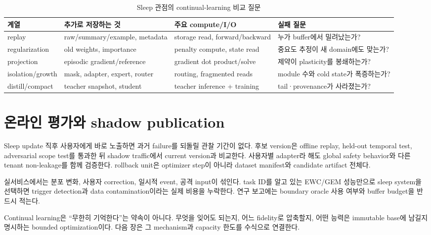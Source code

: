 \begin{table}[htbp]
\centering
\caption{Sleep 관점의 continual-learning 비교 질문}
\label{tab:bg-cl-comparison}
\small
\begin{tabularx}{\textwidth}{p{} X X X}
\toprule
계열 & 추가로 저장하는 것 & 주요 compute/I/O & 실패 질문 \\
\midrule
replay & raw/summary/example, metadata & storage read, forward/backward & 누가 buffer에서 밀려났는가? \\
regularization & old weights, importance & penalty compute, state read & 중요도 추정이 새 domain에도 맞는가? \\
projection & episodic gradient/reference & gradient dot product/solve & 제약이 plasticity를 봉쇄하는가? \\
isolation/growth & mask, adapter, expert, router & routing, fragmented reads & module 수와 cold state가 폭증하는가? \\
distill/compact & teacher snapshot, student & teacher inference + training & tail·provenance가 사라졌는가? \\
\bottomrule
\end{tabularx}
\end{table}

\section{온라인 평가와 shadow publication}

Sleep update 직후 사용자에게 바로 노출하면 과거 failure를 되돌릴 관찰 기간이 없다. 후보 version은
offline replay, held-out temporal test, adversarial scope test를 통과한 뒤 shadow traffic에서 current
version과 비교한다. 사용자별 adapter라 해도 global safety behavior와 다른 tenant non-leakage를 함께
검증한다. rollback unit은 optimizer step이 아니라 dataset manifest와 candidate artifact 전체다.

\begin{cautionbox}
실서비스에서는 분포 변화, 사용자 correction, 일시적 event, 공격 input이 섞인다. task ID를 알고 있는
EWC/GEM 성능만으로 sleep system을 선택하면 trigger detection과 data contamination이라는 실제 비용을
누락한다. 연구 보고에는 boundary oracle 사용 여부와 buffer budget을 반드시 적는다.
\end{cautionbox}

Continual learning은 ``무한히 기억한다''는 약속이 아니다. 무엇을 잊어도 되는지, 어느 fidelity로
압축할지, 어떤 능력은 immutable base에 남길지 명시하는 bounded optimization이다. 다음 장은 그
mechanism과 capacity 한도를 수식으로 연결한다.
